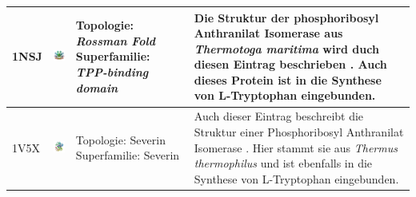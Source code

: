 \documentclass{article}
\begin{document}
\begin{table}
\begin{center}
\begin{tabular}{ | C{9mm} | C{30mm} | C{29mm} | C{38mm} | }
1NSJ  & \includegraphics[width=30mm, trim= -10 -5 -5 -10]{1NSJ_bio_r_500.jpg}  & Topologie: \newline \textit{Rossman Fold} \newline Superfamilie: \newline \textit{TPP-binding domain} & Die Struktur der phosphoribosyl Anthranilat Isomerase aus \textit{Thermotoga maritima} wird duch diesen Eintrag beschrieben \cite{1nsj}. Auch dieses Protein ist in die Synthese von L-Tryptophan eingebunden. \\ \hline
1V5X  & \includegraphics[width=30mm, trim= -10 -5 -5 -10]{1V5X_bio_r_500.jpg} & Topologie: \newline Severin \newline Superfamilie: \newline Severin & Auch dieser Eintrag beschreibt die Struktur einer Phosphoribosyl Anthranilat Isomerase \cite{1v5x}. Hier stammt sie aus \textit{Thermus thermophilus} und ist ebenfalls in die Synthese von L-Tryptophan eingebunden. \\ 
\hline


\end{tabular}
\end{center}
\end{table}
\end{document}
